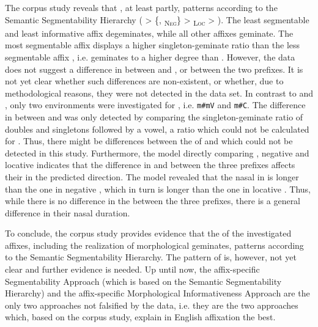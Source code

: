 The corpus study reveals that , at least partly, patterns according to the Semantic Segmentability Hierarchy ( > \{, \textsubscript{\textsc{Neg}}\} >  \textsubscript{\textsc{Loc}} > ). 
The least segmentable and least informative affix  degeminates, while all other affixes geminate. The most segmentable affix  displays a higher singleton-geminate ratio than the less segmentable affix , i.e.  geminates to a higher degree than . However, the data does not suggest a difference in  between  and , or between the two prefixes.
 It is not yet clear whether such differences are non-existent, or whether, due to methodological reasons, they were not detected in the data set. 
  In contrast to  and , only two environments were investigated for , i.e. \texttt{m\#mV} and \texttt{m\#C}. The difference in  between  and  was only detected by comparing the singleton-geminate ratio of doubles and singletons followed by a vowel, a ratio which could not be calculated for . Thus, there might be differences between the  of  and  which could not be detected in this study.
Furthermore, the model directly comparing , negative  and locative  indicates that the difference in  and  between the three prefixes affects their  in the predicted direction. The model revealed that the nasal in  is longer than the one in negative , which in turn is longer than the one in locative . Thus, while there is no difference in the  between the three prefixes, there is a general difference in  their nasal duration.
 
To conclude, the corpus study provides evidence that the  of the investigated affixes, including the realization of morphological geminates, patterns according to the Semantic Segmentability Hierarchy. The pattern of  is, however, not yet clear and further evidence is needed. 
Up until now, the affix-specific Segmentability Approach (which is based on the Semantic Segmentability Hierarchy) and the affix-specific Morphological Informativeness Approach are the only two approaches not falsified by the data, i.e. they are the two approaches which, based on the corpus study, explain  in English affixation the best.

